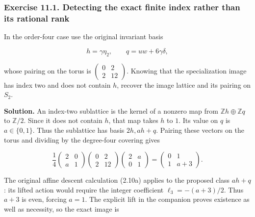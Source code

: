 \label{courseIII:integral-homology-and-sphere-recognition:section-11}

\subsubsection{Exercise 11.1. Detecting the exact finite index rather than its rational rank}
\label{courseIII:integral-homology-and-sphere-recognition:exercise-11.1}

In the order-four case use the original invariant basis

\begin{equation}
h=\gamma\eta_2,\qquad q=uw+6\gamma\delta,
\label{courseIII:integral-homology-and-sphere-recognition:eq:11.1}
\end{equation}

whose pairing on the torus is \(\begin{pmatrix}0&2\\2&12\end{pmatrix}\).
Knowing that the specialization image has index two and does not contain \(h\), recover the image lattice and its pairing on \(S_2\).

\textbf{Solution.} An index-two sublattice is the kernel of a nonzero map from \(\mathbb Z h\oplus\mathbb Zq\) to \(\mathbb Z/2\). Since it does not contain \(h\), that map takes \(h\) to \(1\). Its value on \(q\) is \(a\in\{0,1\}\). Thus the sublattice has basis \(2h,ah+q\). Pairing these vectors on the torus and dividing by the degree-four covering gives

\begin{equation}
\frac14
\begin{pmatrix}2&0\\a&1\end{pmatrix}
\begin{pmatrix}0&2\\2&12\end{pmatrix}
\begin{pmatrix}2&a\\0&1\end{pmatrix}
=
\begin{pmatrix}0&1\\1&a+3\end{pmatrix}.
\label{courseIII:integral-homology-and-sphere-recognition:eq:11.2}
\end{equation}

The original affine descent calculation (2.10a) applies to the proposed class \(a h+q\): its lifted action would require the integer coefficient \(\ell_3=-(a+3)/2\). Thus \(a+3\) is even, forcing \(a=1\). The explicit lift in the companion proves existence as well as necessity, so the exact image is

